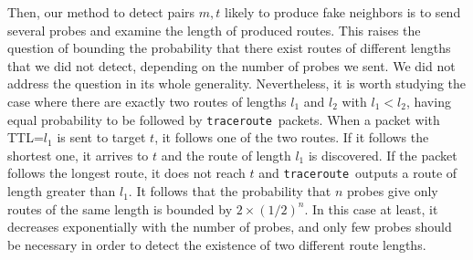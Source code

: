 \documentclass[conference]{IEEEtran}
\newcommand{\traceroute}{{\tt traceroute}}
\begin{document}

Then, our method to detect pairs $m,t$ likely to produce fake neighbors is to send several probes and examine the length of produced routes.
This raises the question of bounding the probability that there exist routes of different lengths that we did not detect, depending on the number of probes we sent. 
We did not address the question in its whole generality. Nevertheless, it is worth studying the case where there are exactly two routes of lengths $l_1$ and $l_2$ with $l_1<l_2$, having equal probability to be followed by \traceroute\ packets.
When a packet with TTL=$l_1$ is sent to target $t$, it follows one of the two routes. If it follows the shortest one, it arrives to $t$ and the route of length $l_1$ is discovered. If the packet follows the longest route, it does not reach $t$ and \traceroute\ outputs a route of length greater than $l_1$. It follows that the probability that $n$ probes give only routes of the same length is bounded by $2\times(1/2)^n$. In this case at least, it decreases exponentially with the number of probes, and only few probes should be necessary in order to detect the existence of two different route lengths.


\end{document}

